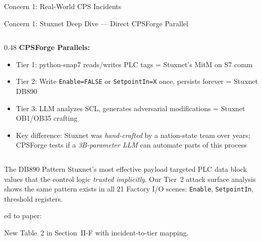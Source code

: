 \documentclass[aspectratio=169,10pt]{beamer}
\begin{document}
\begin{frame}{Concern 1: Real-World CPS Incidents}
{\begin{frame}{Concern 1: Stuxnet Deep Dive --- Direct CPSForge Parallel}
\begin{columns}[T]
\begin{column}{0.48\textwidth}
\textbf{CPSForge Parallels:}
\begin{itemize}\small
    \item \textcolor{tier1}{Tier 1}: python-snap7 reads/writes PLC tags = Stuxnet's MitM on S7 comm
    \item \textcolor{tier2}{Tier 2}: Write \texttt{Enable=FALSE} or \texttt{SetpointIn=X} once, persists forever = Stuxnet DB890
    \item \textcolor{tier3}{Tier 3}: LLM analyzes SCL, generates adversarial modifications = Stuxnet OB1/OB35 crafting
    \item Key difference: Stuxnet was \emph{hand-crafted} by a nation-state team over years; CPSForge tests if a \emph{3B-parameter LLM} can automate parts of this process
\end{itemize}
\end{column}
\end{columns}

\vspace{0.3em}
\begin{alertblock}{The DB890 Pattern}
Stuxnet's most effective payload targeted PLC data block values that the control logic \emph{trusted implicitly}. Our Tier~2 attack surface analysis shows the same pattern exists in all 21 Factory I/O scenes: \texttt{Enable}, \texttt{SetpointIn}, threshold registers.
\end{alertblock}
\end{frame}ed to paper:} New Table~2 in Section~II-F with incident-to-tier mapping.
\end{frame}
\end{document}
